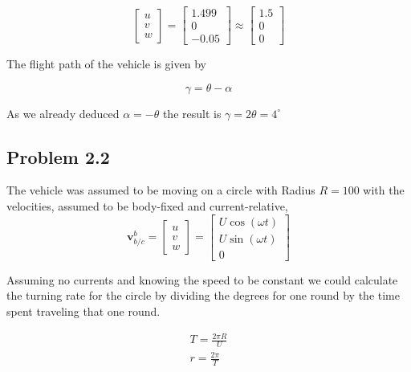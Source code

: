 \begin{equation}
    \begin{bmatrix}
		u \\
		v \\
		w
	\end{bmatrix}
	= 
	\begin{bmatrix}
		1.499 \\
		0 \\
		-0.05	
	\end{bmatrix}
	\approx 
	\begin{bmatrix}
		1.5 \\
		0 \\
		0	
	\end{bmatrix}
\end{equation}

The flight path of the vehicle is given by 

\begin{equation}
    \gamma = \theta - \alpha
\end{equation}

As we already deduced $\alpha = -\theta$ the result is $\gamma = 2\theta = 4^\circ$

\subsection*{Problem 2.2}
The vehicle was assumed to be moving on a circle with Radius $R = 100$ with the velocities, assumed to be body-fixed and current-relative,
\begin{equation}
\label{eq:velocity}
    \mathbf{v}^b_{b/c} = 
	\begin{bmatrix}
		u \\
		v \\
		w
	\end{bmatrix}
	= 
	\begin{bmatrix}
		U \cos( \omega t)\\
		U \sin(\omega t)\\
		0	
	\end{bmatrix}
\end{equation}

Assuming no currents and knowing the speed to be constant we could calculate the turning rate for the circle by dividing the degrees for one round by the time spent traveling that one round.

\begin{subequations}
    \begin{align}
        T = \frac{2\pi R}{U} \\
        r = \frac{2\pi}{T}
    \end{align}
\end{subequations}

